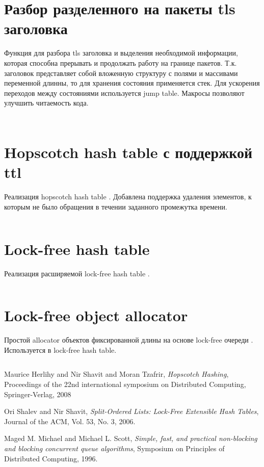 \documentclass[11pt, a4paper]{article}
\begin{document}
\section{Разбор разделенного на пакеты tls заголовка}

Функция для разбора tls заголовка и выделения необходимой информации,
которая способна прерывать и продолжать работу на границе
пакетов. Т.к. заголовок представляет собой вложенную структуру с
полями и массивами переменной длинны, то для хранения состояния
применяется стек. Для ускорения переходов между состояниями
используется jump table. Макросы позволяют улучшить читаемость кода.

\inputminted{cpp}{code/tls_reader.h}
\inputminted{cpp}{code/tls_reader.cc}

\section{Hopscotch hash table с поддержкой ttl}

Реализация hopscotch hash table \cite{hopscotch08}. Добавлена
поддержка удаления элементов, к которым не было обращения в течении
заданного промежутка времени.

\inputminted{cpp}{code/hopscotch_ttl_hash.h}

\section{Lock-free hash table}

Реализация расширяемой lock-free hash table \cite{splitordered06}.

\inputminted{cpp}{code/split_ordered.h}

\section{Lock-free object allocator}

Простой allocator объектов фиксированной длины на основе lock-free
очереди \cite{queue96}. Используется в lock-free hash table.

\inputminted{cpp}{code/object_allocator.h}

\begin{thebibliography}{9}

  Maurice Herlihy and Nir Shavit and Moran Tzafrir,
  \emph{Hopscotch Hashing},
  Proceedings of the 22nd international symposium on Distributed Computing,
  Springer-Verlag,
  2008

  Ori Shalev and Nir Shavit,
  \emph{Split-Ordered Lists: Lock-Free Extensible Hash Tables},
  Journal of the ACM, Vol. 53, No. 3,
  2006.

  Maged M. Michael and Michael L. Scott,
  \emph{Simple, fast, and practical non-blocking and
    blocking concurrent queue algorithms},
  Symposium on Principles of Distributed Computing,
  1996.

\end{thebibliography}
\end{document}

